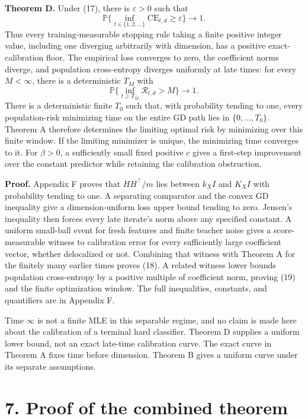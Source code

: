 \documentclass[
  11pt,
  a4paper,
]{article}
\begin{document}
\textbf{Theorem D.} Under (17), there is \(\varepsilon>0\) such that \[
\mathbb P\{\inf_{t\in\{1,2,\ldots\}}\mathrm{CE}_{t,d}
\ge\varepsilon\}\longrightarrow1. \tag{18}
\] Thus every training-measurable stopping rule taking a finite positive
integer value, including one diverging arbitrarily with dimension, has a
positive exact-calibration floor. The empirical loss converges to zero,
the coefficient norms diverge, and population cross-entropy diverges
uniformly at late times: for every \(M<\infty\), there is a
deterministic \(T_M\) with \[
\mathbb P\{\inf_{t\ge T_M}\mathcal R_{t,d}>M\}\longrightarrow1.
\tag{19}
\] There is a deterministic finite \(T_0\) such that, with probability
tending to one, every population-risk minimizing time on the entire GD
path lies in \(\{0,\ldots,T_0\}\). Theorem A therefore determines the
limiting optimal risk by minimizing over this finite window. If the
limiting minimizer is unique, the minimizing time converges to it. For
\(\beta>0\), a sufficiently small fixed positive \(c\) gives a
first-step improvement over the constant predictor while retaining the
calibration obstruction.

\textbf{Proof.} Appendix F proves that \(HH^\top/m\) lies between
\(k_XI\) and \(K_XI\) with probability tending to one. A separating
comparator and the convex GD inequality give a dimension-uniform loss
upper bound tending to zero. Jensen's inequality then forces every late
iterate's norm above any specified constant. A uniform small-ball event
for fresh features and finite teacher noise gives a score-measurable
witness to calibration error for every sufficiently large coefficient
vector, whether delocalized or not. Combining that witness with Theorem
A for the finitely many earlier times proves (18). A related witness
lower bounds population cross-entropy by a positive multiple of
coefficient norm, proving (19) and the finite optimization window. The
full inequalities, constants, and quantifiers are in Appendix F.

Time \(\infty\) is not a finite MLE in this separable regime, and no
claim is made here about the calibration of a terminal hard classifier.
Theorem D supplies a uniform lower bound, not an exact late-time
calibration curve. The exact curve in Theorem A fixes time before
dimension. Theorem B gives a uniform curve under its separate
assumptions.

\hypertarget{proof-of-the-combined-theorem}{%
\section{7. Proof of the combined
theorem}\label{proof-of-the-combined-theorem}}
\end{document}
